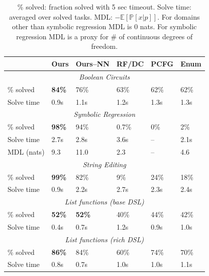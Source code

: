 \documentclass{article}
\newcommand{\expect}{\mathds{E}} %
\newcommand{\probability}{\mathds{P}} %
\begin{document}
\begin{table}
\tabcolsep=4pt
\renewcommand{\arraystretch}{0.5}
\begin{tabular}{llllll}
  \toprule& Ours&Ours--NN  & RF/DC & PCFG & Enum

  \\\midrule\multicolumn{6}{c}{\emph{Boolean Circuits}}\\\midrule
  \% solved &
  \textbf{84\%} &76\%& 63\%&62\%&62\%\\
  Solve time&  0.9s&  1.1s&1.2s&1.3s&1.3s

  \\\midrule\multicolumn{6}{c}{\emph{Symbolic Regression}}\\\midrule
  \% solved&   \textbf{ 98\% }&94\%&0.7\%&0\%&2\% \\
  Solve time&  2.7s& 2.8s  &3.6s&--&2.1s\\
  MDL (nats)&   9.3 &11.0&2.3&--&4.6

  \\\midrule\multicolumn{6}{c}{\emph{String Editing}}\\\midrule
  \% solved&\textbf{99\%} &82\% &9\%&24\%&18\%\\
  Solve time&  0.9s&2.2s&2.7s&2.3s&2.4s

  \\\midrule\multicolumn{6}{c}{\emph{List functions (base DSL)}}\\\midrule
  \% solved&\textbf{52\%} &\textbf{52\%} &40\%&44\%&42\%\\
  Solve time&  0.4s&0.7s&1.2s&0.9s&1.0s

  \\\midrule\multicolumn{6}{c}{\emph{List functions (rich DSL)}}\\\midrule
  \% solved&\textbf{86\%} &84\% &60\%&74\%&70\%\\
  Solve time&  0.8s&0.7s&1.0s&1.0s&1.1s
  \\\bottomrule
  \end{tabular}
\caption{\% solved: fraction solved with 5 sec timeout. Solve time: averaged over solved tasks. MDL: $-\expect\left[\probability[x|p] \right]$. For domains other than symbolic regression MDL is 0 nats. For symbolic regression MDL is a proxy for \# of continuous degrees of freedom.}\label{baselineComparisons}  \end{table}
\end{document}
